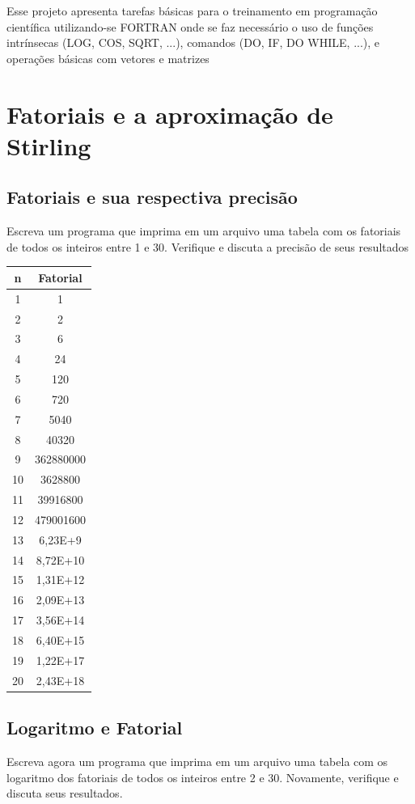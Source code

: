 \documentclass[a4paper, 12pt]{article}
\begin{document}
\justifying


Esse projeto apresenta tarefas básicas para o treinamento em programação científica utilizando-se FORTRAN onde
se faz necessário o uso de funções intrínsecas (LOG, COS, SQRT, ...), comandos (DO, IF, DO WHILE, ...), e operações
básicas com vetores e matrizes



\section{Fatoriais e a aproximação de Stirling}

\subsection{Fatoriais e sua respectiva precisão}

Escreva um programa que imprima em um arquivo uma tabela com os fatoriais de todos os inteiros entre
1 e 30. Verifique e discuta a precisão de seus resultados

\begin{table}[H]
	\centering
\begin{tabular}{ c | c } 
	n	&Fatorial\\ \hline
	1	&1\\
	2	&2\\
	3	&6\\
	4	&24\\
	5	&120\\
	6	&720\\
	7	&5040\\
	8	&40320\\
	9	&362880000\\
	10	&3628800\\
	11	&39916800\\
	12	&479001600\\
	13	&6,23E+9\\
	14	&8,72E+10\\
	15	&1,31E+12\\
	16	&2,09E+13\\
	17	&3,56E+14\\
	18	&6,40E+15\\
	19	&1,22E+17\\
	20	&2,43E+18\\

\end{tabular}
\end{table}


\subsection{Logaritmo e Fatorial}
\label{text:log}
Escreva agora um programa que imprima em um arquivo uma tabela com os logaritmo dos fatoriais de
todos os inteiros entre 2 e 30. Novamente, verifique e discuta seus resultados.
\end{document}
